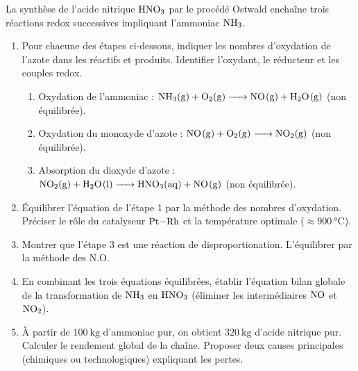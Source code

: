 \documentclass[11pt]{article}
\begin{document}
\begin{exercice}
La synthèse de l'acide nitrique $\ce{HNO3}$ par le procédé Ostwald enchaîne trois réactions redox successives impliquant l'ammoniac $\ce{NH3}$.
\begin{enumerate}
    \item Pour chacune des étapes ci-dessous, indiquer les nombres d'oxydation de l'azote dans les réactifs et produits. Identifier l'oxydant, le réducteur et les couples redox.
    \begin{enumerate}
        \item Oxydation de l'ammoniac : $\ce{NH3(g) + O2(g) -> NO(g) + H2O(g)}$ (non équilibrée).
        \item Oxydation du monoxyde d'azote : $\ce{NO(g) + O2(g) -> NO2(g)}$ (non équilibrée).
        \item Absorption du dioxyde d'azote : $\ce{NO2(g) + H2O(l) -> HNO3(aq) + NO(g)}$ (non équilibrée).
    \end{enumerate}
    \item Équilibrer l'équation de l'étape 1 par la méthode des nombres d'oxydation. Préciser le rôle du catalyseur $\ce{Pt-Rh}$ et la température optimale ($\approx \SI{900}{\celsius}$).
    \item Montrer que l'étape 3 est une réaction de disproportionation. L'équilibrer par la méthode des N.O.
    \item En combinant les trois équations équilibrées, établir l'équation bilan globale de la transformation de $\ce{NH3}$ en $\ce{HNO3}$ (éliminer les intermédiaires $\ce{NO}$ et $\ce{NO2}$).
    \item À partir de $\SI{100}{\kg}$ d'ammoniac pur, on obtient $\SI{320}{\kg}$ d'acide nitrique pur. Calculer le rendement global de la chaîne. Proposer deux causes principales (chimiques ou technologiques) expliquant les pertes.
\end{enumerate}
\end{exercice}
\end{document}
